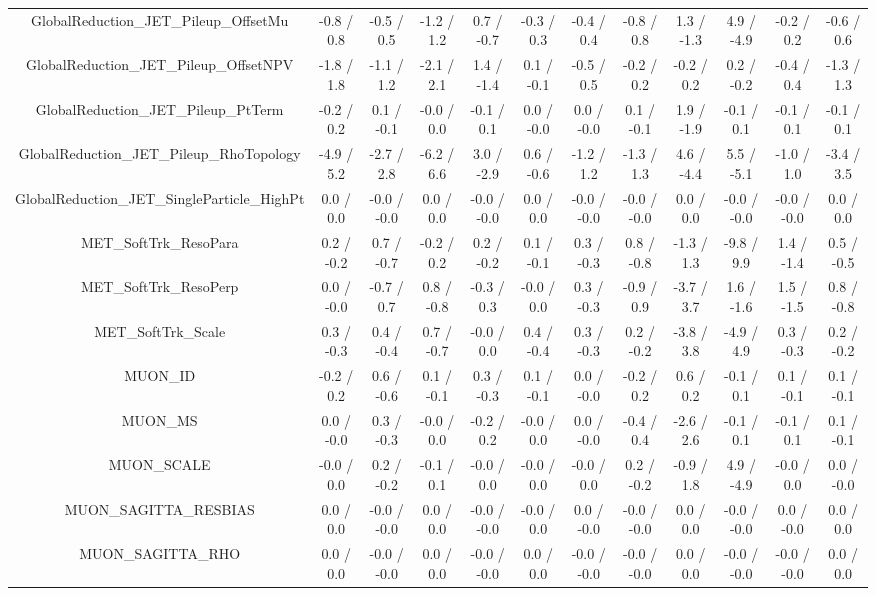 \begin{table}[htbp]
\begin{center}
\begin{tabular}{|c|c|c|c|c|c|c|c|c|c|c|c|}
  GlobalReduction_JET_Pileup_OffsetMu & -0.8 / 0.8 & -0.5 / 0.5 & -1.2 / 1.2 & 0.7 / -0.7 & -0.3 / 0.3 & -0.4 / 0.4 & -0.8 / 0.8 & 1.3 / -1.3 & 4.9 / -4.9 & -0.2 / 0.2 & -0.6 / 0.6 \\ 
  GlobalReduction_JET_Pileup_OffsetNPV & -1.8 / 1.8 & -1.1 / 1.2 & -2.1 / 2.1 & 1.4 / -1.4 & 0.1 / -0.1 & -0.5 / 0.5 & -0.2 / 0.2 & -0.2 / 0.2 & 0.2 / -0.2 & -0.4 / 0.4 & -1.3 / 1.3 \\ 
  GlobalReduction_JET_Pileup_PtTerm & -0.2 / 0.2 & 0.1 / -0.1 & -0.0 / 0.0 & -0.1 / 0.1 & 0.0 / -0.0 & 0.0 / -0.0 & 0.1 / -0.1 & 1.9 / -1.9 & -0.1 / 0.1 & -0.1 / 0.1 & -0.1 / 0.1 \\ 
  GlobalReduction_JET_Pileup_RhoTopology & -4.9 / 5.2 & -2.7 / 2.8 & -6.2 / 6.6 & 3.0 / -2.9 & 0.6 / -0.6 & -1.2 / 1.2 & -1.3 / 1.3 & 4.6 / -4.4 & 5.5 / -5.1 & -1.0 / 1.0 & -3.4 / 3.5 \\ 
  GlobalReduction_JET_SingleParticle_HighPt & 0.0 / 0.0 & -0.0 / -0.0 & 0.0 / 0.0 & -0.0 / -0.0 & 0.0 / 0.0 & -0.0 / -0.0 & -0.0 / -0.0 & 0.0 / 0.0 & -0.0 / -0.0 & -0.0 / -0.0 & 0.0 / 0.0 \\ 
  MET_SoftTrk_ResoPara & 0.2 / -0.2 & 0.7 / -0.7 & -0.2 / 0.2 & 0.2 / -0.2 & 0.1 / -0.1 & 0.3 / -0.3 & 0.8 / -0.8 & -1.3 / 1.3 & -9.8 / 9.9 & 1.4 / -1.4 & 0.5 / -0.5 \\ 
  MET_SoftTrk_ResoPerp & 0.0 / -0.0 & -0.7 / 0.7 & 0.8 / -0.8 & -0.3 / 0.3 & -0.0 / 0.0 & 0.3 / -0.3 & -0.9 / 0.9 & -3.7 / 3.7 & 1.6 / -1.6 & 1.5 / -1.5 & 0.8 / -0.8 \\ 
  MET_SoftTrk_Scale & 0.3 / -0.3 & 0.4 / -0.4 & 0.7 / -0.7 & -0.0 / 0.0 & 0.4 / -0.4 & 0.3 / -0.3 & 0.2 / -0.2 & -3.8 / 3.8 & -4.9 / 4.9 & 0.3 / -0.3 & 0.2 / -0.2 \\ 
  MUON_ID & -0.2 / 0.2 & 0.6 / -0.6 & 0.1 / -0.1 & 0.3 / -0.3 & 0.1 / -0.1 & 0.0 / -0.0 & -0.2 / 0.2 & 0.6 / 0.2 & -0.1 / 0.1 & 0.1 / -0.1 & 0.1 / -0.1 \\ 
  MUON_MS & 0.0 / -0.0 & 0.3 / -0.3 & -0.0 / 0.0 & -0.2 / 0.2 & -0.0 / 0.0 & 0.0 / -0.0 & -0.4 / 0.4 & -2.6 / 2.6 & -0.1 / 0.1 & -0.1 / 0.1 & 0.1 / -0.1 \\ 
  MUON_SCALE & -0.0 / 0.0 & 0.2 / -0.2 & -0.1 / 0.1 & -0.0 / 0.0 & -0.0 / 0.0 & -0.0 / 0.0 & 0.2 / -0.2 & -0.9 / 1.8 & 4.9 / -4.9 & -0.0 / 0.0 & 0.0 / -0.0 \\ 
  MUON_SAGITTA_RESBIAS & 0.0 / 0.0 & -0.0 / -0.0 & 0.0 / 0.0 & -0.0 / -0.0 & -0.0 / 0.0 & 0.0 / -0.0 & -0.0 / -0.0 & 0.0 / 0.0 & -0.0 / -0.0 & 0.0 / -0.0 & 0.0 / 0.0 \\ 
  MUON_SAGITTA_RHO & 0.0 / 0.0 & -0.0 / -0.0 & 0.0 / 0.0 & -0.0 / -0.0 & 0.0 / 0.0 & -0.0 / -0.0 & -0.0 / -0.0 & 0.0 / 0.0 & -0.0 / -0.0 & -0.0 / -0.0 & 0.0 / 0.0 \\ 

\end{tabular}
\end{center}
\end{table}
